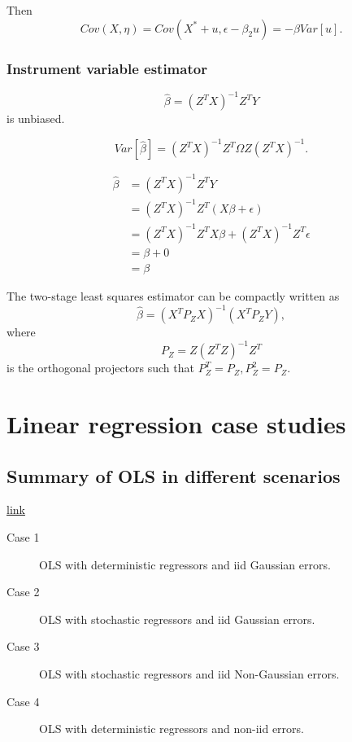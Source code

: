 \begin{refsection}
\begin{remark}
Then $$Cov(X,\eta) = Cov(X^*+u,\epsilon-\beta_2 u) = -\beta Var[u].$$	
\end{remark}



\subsubsection{Instrument variable estimator}

\begin{lemma}
$$\hat{\beta} = (Z^TX)^{-1}Z^TY$$
is unbiased.

$$Var[\hat{\beta}] = (Z^TX)^{-1}Z^T\Omega Z(Z^TX)^{-1}.$$
\end{lemma}
\begin{align*}
\hat{\beta} &= (Z^TX)^{-1}Z^TY \\
&=(Z^TX)^{-1}Z^T(X\beta + \epsilon) \\
&=(Z^TX)^{-1}Z^TX\beta + (Z^TX)^{-1}Z^T\epsilon \\
&=\beta + 0\\
&=\beta
\end{align*}



\begin{lemma}
The two-stage least squares estimator can be compactly written as
$$\hat{\beta} = (X^TP_ZX)^{-1}(X^TP_ZY),$$
where $$P_Z = Z(Z^TZ)^{-1}Z^T$$
is the orthogonal projectors such that $P_Z^T=P_Z, P_Z^2 = P_Z.$	
\end{lemma}





\section{Linear regression case studies}

\subsection{Summary of OLS in different scenarios}
\href{https://www.asc.ohio-state.edu/de-jong.8/note5.pdf}{link}


\begin{description}
	\item[Case 1] OLS with deterministic regressors and iid Gaussian errors.
	\item[Case 2] OLS with stochastic regressors and iid Gaussian errors.
	\item[Case 3] OLS with stochastic regressors and iid Non-Gaussian errors.
	\item[Case 4] OLS with deterministic regressors and non-iid errors.
\end{description}





\end{refsection}
